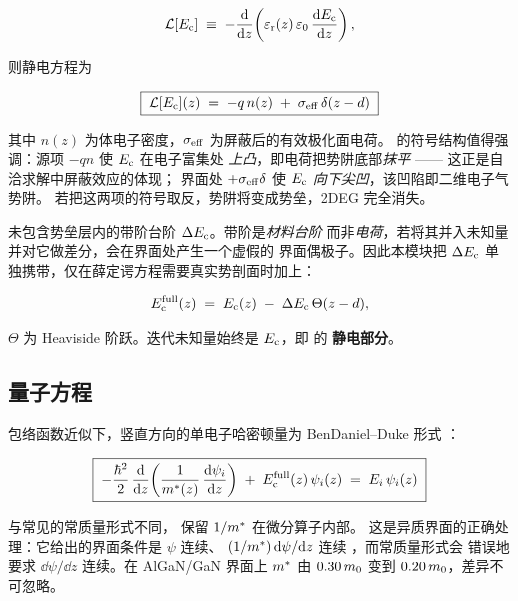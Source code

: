 \begin{equation}
\mathcal{L}[E_{\mathrm{c}}] \;\equiv\; -\frac{\mathrm{d} }{\mathrm{d} z}\!\left(\varepsilon_{\mathrm{r}}(z)\,\varepsilon_{0}\,\frac{\mathrm{d} E_{\mathrm{c}}}{\mathrm{d} z}\right),
\label{eq:poisson-operator}
\end{equation}

则静电方程为

\begin{equation}
\boxed{\;\mathcal{L}[E_{\mathrm{c}}](z) \;=\; -q\,n(z) \;+\; \sigma_{\mathrm{eff}}\,\delta(z-d)\;}
\label{eq:poisson}
\end{equation}

其中 $n(z)$ 为体电子密度，$\sigma_{\mathrm{eff}}$ 为屏蔽后的有效极化面电荷。
 的符号结构值得强调：源项 $-qn$ 使 $E_{\mathrm{c}}$ 在电子富集处
\emph{上凸}，即电荷把势阱底部\emph{抹平} —— 这正是自洽求解中屏蔽效应的体现；
界面处 $+\sigma_{\mathrm{eff}}\delta$ 使 $E_{\mathrm{c}}$ \emph{向下尖凹}，该凹陷即二维电子气势阱。
若把这两项的符号取反，势阱将变成势垒，2DEG 完全消失。

 未包含势垒层内的带阶台阶 $\Delta E_{\mathrm{c}}$。带阶是\emph{材料台阶}
而非\emph{电荷}，若将其并入未知量并对它做差分，会在界面处产生一个虚假的
界面偶极子。因此本模块把 $\Delta E_{\mathrm{c}}$ 单独携带，仅在薛定谔方程需要真实势剖面时加上：

\begin{equation}
E_{\mathrm{c}}^{\mathrm{full}}(z) \;=\; E_{\mathrm{c}}(z) \;-\; \Delta E_{\mathrm{c}}\,\Theta(z-d),
\label{eq:offset}
\end{equation}

$\Theta$ 为 Heaviside 阶跃。迭代未知量始终是 $E_{\mathrm{c}}$，即  的
\textbf{静电部分}。

\subsection{量子方程}
\label{sec:sp1d-schrodinger}

包络函数近似下，竖直方向的单电子哈密顿量为 BenDaniel--Duke 形式
\cite{benDaniel1966}：

\begin{equation}
\boxed{\;
-\frac{\hbar^{2}}{2}\,\frac{\mathrm{d} }{\mathrm{d} z}\!\left(\frac{1}{m^{*}(z)}\,\frac{\mathrm{d} \psi_i}{\mathrm{d} z}\right)
\;+\; E_{\mathrm{c}}^{\mathrm{full}}(z)\,\psi_i(z)
\;=\; E_{i}\,\psi_i(z)
\;}
\label{eq:schrodinger}
\end{equation}

与常见的常质量形式不同， 保留 $1/m^{*}$ 在微分算子内部。
这是异质界面的正确处理：它给出的界面条件是 $\psi$ 连续、
$(1/m^{*})\,\mathrm{d}\psi/\mathrm{d} z$ 连续 \cite{benDaniel1966}，而常质量形式会
错误地要求 $\dd\psi/\dd z$ 连续。在 AlGaN/GaN 界面上 $m^{*}$ 由 $0.30\,m_{0}$
变到 $0.20\,m_{0}$，差异不可忽略。


